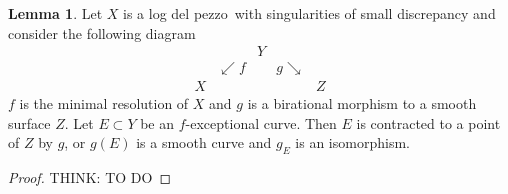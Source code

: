 \documentclass[11pt]{report}
\theoremstyle{definition}
\theoremstyle{definition}
\theoremstyle{definition}
\theoremstyle{definition}
\theoremstyle{definition}
\newtheorem{lem}[thm]{Lemma}
\theoremstyle{definition}
\theoremstyle{definition}
\theoremstyle{definition}
\newcommand{\ldp}{log del pezzo}
\begin{document}
\begin{lem}
Let $X$ is a \ldp\ with singularities of small discrepancy and 
consider the following diagram
\[
\begin{array}{ccccc}
&&Y\\
&\swarrow f && g\searrow \\
X&&&&Z
\end{array}
\]
$f$ is the minimal resolution of $X$ and $g$ is a birational
morphism to a smooth surface $Z$.
Let $E\subset Y$ be an $f$-exceptional curve. Then $E$ is contracted to a point
of $Z$ by $g$, or $g(E)$ is a smooth curve and $g_E$ is an isomorphism.
\end{lem}

\begin{proof}
THINK: TO DO
\end{proof}
\end{document}
